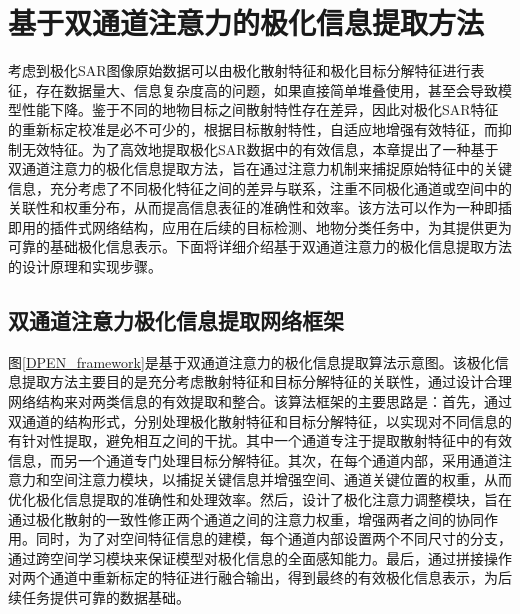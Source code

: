 \section{基于双通道注意力的极化信息提取方法}
考虑到极化SAR图像原始数据可以由极化散射特征和极化目标分解特征进行表征，存在数据量大、信息复杂度高的问题，如果直接简单堆叠使用，甚至会导致模型性能下降。鉴于不同的地物目标之间散射特性存在差异，因此对极化SAR特征的重新标定校准是必不可少的，根据目标散射特性，自适应地增强有效特征，而抑制无效特征。为了高效地提取极化SAR数据中的有效信息，本章提出了一种基于双通道注意力的极化信息提取方法，旨在通过注意力机制来捕捉原始特征中的关键信息，充分考虑了不同极化特征之间的差异与联系，注重不同极化通道或空间中的关联性和权重分布，从而提高信息表征的准确性和效率。该方法可以作为一种即插即用的插件式网络结构，应用在后续的目标检测、地物分类任务中，为其提供更为可靠的基础极化信息表示。下面将详细介绍基于双通道注意力的极化信息提取方法的设计原理和实现步骤。

\subsection{双通道注意力极化信息提取网络框架}

图\ref{DPEN_framework}是基于双通道注意力的极化信息提取算法示意图。该极化信息提取方法主要目的是充分考虑散射特征和目标分解特征的关联性，通过设计合理网络结构来对两类信息的有效提取和整合。该算法框架的主要思路是：首先，通过双通道的结构形式，分别处理极化散射特征和目标分解特征，以实现对不同信息的有针对性提取，避免相互之间的干扰。其中一个通道专注于提取散射特征中的有效信息，而另一个通道专门处理目标分解特征。其次，在每个通道内部，采用通道注意力和空间注意力模块，以捕捉关键信息并增强空间、通道关键位置的权重，从而优化极化信息提取的准确性和处理效率。然后，设计了极化注意力调整模块，旨在通过极化散射的一致性修正两个通道之间的注意力权重，增强两者之间的协同作用。同时，为了对空间特征信息的建模，每个通道内部设置两个不同尺寸的分支，通过跨空间学习模块来保证模型对极化信息的全面感知能力。最后，通过拼接操作对两个通道中重新标定的特征进行融合输出，得到最终的有效极化信息表示，为后续任务提供可靠的数据基础。

